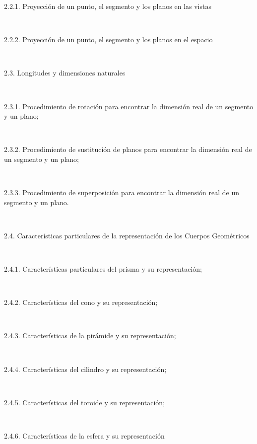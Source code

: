 \documentclass[letterpaper]{article}%
\begin{document}
\begin{tcolorbox}
\hspace*{0.04\linewidth}\parbox{0.96\linewidth}{\strut 2.2.1. Proyección de un punto, el segmento y los planos en las vistas\strut}\\
\hspace*{0.04\linewidth}\parbox{0.96\linewidth}{\strut 2.2.2. Proyección de un punto, el segmento y los planos en el espacio\strut}\\
\hspace*{0.02\linewidth}\parbox{0.98\linewidth}{\strut 2.3. Longitudes y dimensiones naturales\strut}\\
\hspace*{0.04\linewidth}\parbox{0.96\linewidth}{\strut 2.3.1. Procedimiento de rotación para encontrar la dimensión real de un segmento y un plano;\strut}\\
\hspace*{0.04\linewidth}\parbox{0.96\linewidth}{\strut 2.3.2. Procedimiento de sustitución de planos para encontrar la dimensión real de un segmento y un plano;\strut}\\
\hspace*{0.04\linewidth}\parbox{0.96\linewidth}{\strut 2.3.3. Procedimiento de superposición para encontrar la dimensión real de un segmento y un plano.\strut}\\
\hspace*{0.02\linewidth}\parbox{0.98\linewidth}{\strut 2.4. Características particulares de la representación de los Cuerpos Geométricos\strut}\\
\hspace*{0.04\linewidth}\parbox{0.96\linewidth}{\strut 2.4.1. Características particulares del prisma y su representación;\strut}\\
\hspace*{0.04\linewidth}\parbox{0.96\linewidth}{\strut 2.4.2. Características del cono y su representación;\strut}\\
\hspace*{0.04\linewidth}\parbox{0.96\linewidth}{\strut 2.4.3. Características de la pirámide y su representación;\strut}\\
\hspace*{0.04\linewidth}\parbox{0.96\linewidth}{\strut 2.4.4. Características del cilindro y su representación;\strut}\\
\hspace*{0.04\linewidth}\parbox{0.96\linewidth}{\strut 2.4.5. Características del toroide y su representación;\strut}\\
\hspace*{0.04\linewidth}\parbox{0.96\linewidth}{\strut 2.4.6. Características de la esfera y su representación\strut}\\

\end{tcolorbox}
\end{document}
